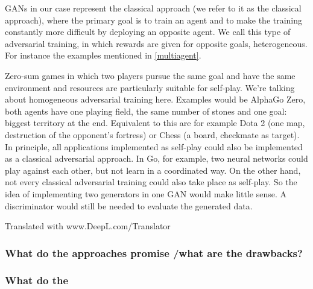 GANs in our case represent the classical approach (we refer to it as the classical approach), where the primary goal is to train an agent and to make the training constantly more difficult by deploying an opposite agent. We call this type of adversarial training, in which rewards are given for opposite goals, heterogeneous. For instance the examples mentioned in \ref{multiagent}.


Zero-sum games in which two players pursue the same goal and have the same environment and resources are particularly suitable for self-play. We're talking about homogeneous adversarial training here. Examples would be AlphaGo Zero, both agents have one playing field, the same number of stones and one goal: biggest territory at the end. Equivalent to this are for example Dota 2 (one map, destruction of the opponent's fortress) or Chess (a board, checkmate as target).
In principle, all applications implemented as self-play could also be implemented as a classical adversarial approach. In Go, for example, two neural networks could play against each other, but not learn in a coordinated way. On the other hand, not every classical adversarial training could also take place as self-play. So the idea of implementing two generators in one GAN would make little sense. A discriminator would still be needed to evaluate the generated data.

Translated with www.DeepL.com/Translator

\subsubsection{What do the approaches promise /what are the drawbacks?}


\subsubsection{What do the }